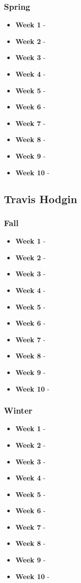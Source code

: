 \documentclass[onecolumn, draftclsnofoot,10pt, compsoc]{IEEEtran}
\begin{document}
			\subsubsection{Spring}
				\begin{itemize}
					\item \textbf{Week 1} - 
					\item \textbf{Week 2} - 
					\item \textbf{Week 3} - 
					\item \textbf{Week 4} - 
					\item \textbf{Week 5} - 
					\item \textbf{Week 6} - 
					\item \textbf{Week 7} - 
					\item \textbf{Week 8} - 
					\item \textbf{Week 9} - 
					\item \textbf{Week 10} - 
				\end{itemize}
		\subsection{Travis Hodgin}
			\subsubsection{Fall}
				\begin{itemize}
					\item \textbf{Week 1} - 
					\item \textbf{Week 2} - 
					\item \textbf{Week 3} - 
					\item \textbf{Week 4} - 
					\item \textbf{Week 5} - 
					\item \textbf{Week 6} - 
					\item \textbf{Week 7} - 
					\item \textbf{Week 8} - 
					\item \textbf{Week 9} - 
					\item \textbf{Week 10} - 
				\end{itemize}
			\subsubsection{Winter}
				\begin{itemize}
					\item \textbf{Week 1} - 
					\item \textbf{Week 2} - 
					\item \textbf{Week 3} - 
					\item \textbf{Week 4} - 
					\item \textbf{Week 5} - 
					\item \textbf{Week 6} - 
					\item \textbf{Week 7} - 
					\item \textbf{Week 8} - 
					\item \textbf{Week 9} - 
					\item \textbf{Week 10} - 
				\end{itemize}
\end{document}

